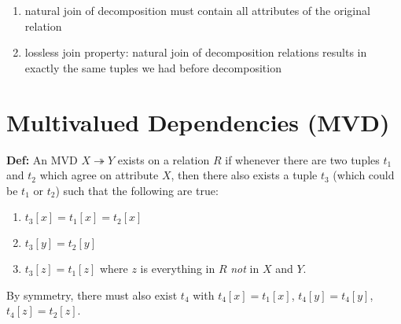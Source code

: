 \documentclass{../cheatsheet}
\begin{document}
\begin{multicols*}{2}
    \begin{enumerate}
        \item natural join of decomposition must contain all attributes of the
            original relation
        \item lossless join property: natural join of decomposition relations
            results in exactly the same tuples we had before decomposition
    \end{enumerate}

    \section{Multivalued Dependencies (MVD)}
    \textbf{Def:} An MVD $X \twoheadrightarrow Y$ exists on a relation $R$ if
    whenever there are two tuples $t_1$ and $t_2$ which agree on attribute $X$, then
    there also exists a tuple $t_3$ (which could be $t_1$ or $t_2$) such that the
    following are true:

    \begin{enumerate}
        \item $t_3[x] = t_1[x] = t_2[x]$
        \item $t_3[y] = t_2[y]$
        \item $t_3[z] = t_1[z]$ where $z$ is everything in $R$ \textit{not} in $X$
            and $Y$.
    \end{enumerate}

    By symmetry, there must also exist $t_4$ with $t_4[x] = t_1[x]$, $t_4[y] =
    t_4[y]$, $t_4[z] = t_2[z]$.

\end{multicols*}
\end{document}
